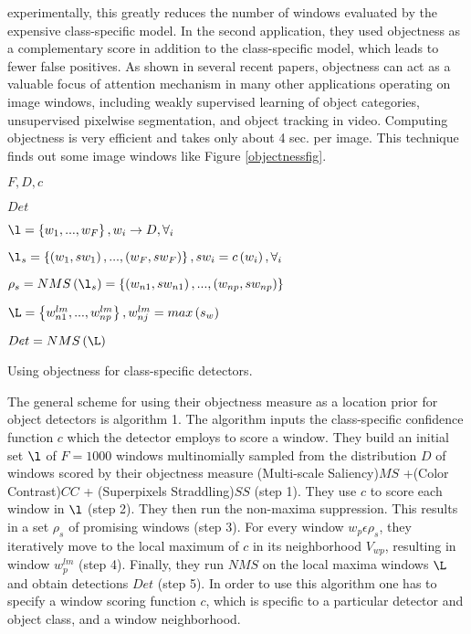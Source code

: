 experimentally, this greatly reduces the number of windows evaluated by the expensive class-specific model. In the second application,
they used objectness as a complementary score in addition to the class-specific model, which leads to fewer false positives. As shown in
several recent papers, objectness can act as a valuable focus of attention mechanism in many other applications operating on image
windows, including weakly supervised learning of object categories, unsupervised pixelwise segmentation, and object tracking in video.
Computing objectness is very efficient and takes only about 4 sec. per image. This technique finds out some image windows like Figure \ref{objectnessfig}. \hfill \break

\begin{algorithm}[H]
\SetAlgoLined
\begin{description}\itemsep1pt \parskip0pt  \vspace{.5cm}
  \item[Input:] \(F, D, c\) 
  \item[Ouput:] \(Det\)
  \item[Step 1:] \( \l = \left \{ w_{1},...,w_{F} \right \}, w_{i}\rightarrow D, \forall_{i} \)
  \item[Step 2:] \( \l_{s} = \left \{ \left ( w_{1},sw_{1} \right ),...,\left ( w_{F},sw_{F} \right )  \right \}, sw_{i}= c\left ( w_{i} \right ), \forall_{i} \) 
  \item[Step 3:] \( \rho _{s} = NMS\left ( \l_{s} \right )=\left \{ \left ( w_{n1},sw_{n1} \right ),...,\left ( w_{np},sw_{np} \right )  \right \}\)
  \item[Step 4:] \(\L=\left \{ w_{n1}^{lm},..., w_{np}^{lm} \right \}, w_{nj}^{lm} = max \left ( s_{w} \right )\)
  \item[Step 5:] \(Det = NMS\left ( \L \right )\)
\end{description}
\caption{Using objectness for class-specific detectors.}
\end{algorithm}

\hfill \break
The general scheme for using their objectness measure as
a location prior for object detectors is algorithm 1. The
algorithm inputs the class-specific confidence function \(c\) which
the detector employs to score a window.
They build an initial set \(\l\) of \(F = 1000\) windows multinomially sampled from the distribution \(D\) of windows scored by
their objectness measure (Multi-scale Saliency)\(MS\) +(Color Contrast)\(CC\) + (Superpixels Straddling)\(SS\) (step 1). They use \(c\) to
score each window in \(\l\) (step 2). They then run the non-maxima
suppression. This results in a set \(\rho_{s}\) of promising
windows (step 3). For every window \(w_{p} \epsilon \rho_{s}\), they iteratively
move to the local maximum of \(c\) in its neighborhood \(V_{w
p}\),
resulting in window \(w_{p}^{lm}\) (step 4). Finally, they run \(NMS\) on the
local maxima windows \(\L\) and obtain detections \(Det\) (step 5).
In order to use this algorithm one has to specify a window
scoring function \(c\), which is specific to a particular detector
and object class, and a window neighborhood.



